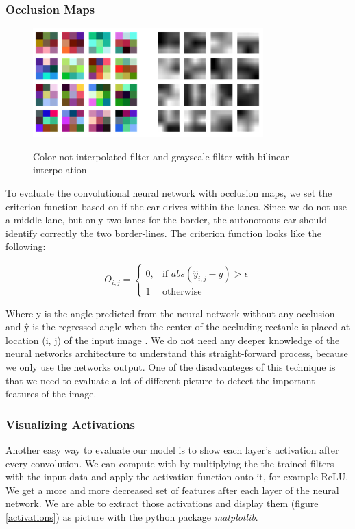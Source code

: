 \documentclass[journal]{IEEEtran}
\begin{document}
\subsubsection{Occlusion Maps}
\begin{figure}
  \begin{center}
  \includegraphics[width=3.5in]{photo/filter.png}\\
  \caption{Color not interpolated filter and grayscale filter with bilinear interpolation \cite{master}}\label{filter}
  \end{center}
\end{figure}

To evaluate the convolutional neural network with occlusion maps, we set the criterion function based on if the car drives within the lanes. Since we do not use a middle-lane, but only two lanes for the border, the autonomous car should identify correctly the two border-lines. The criterion function looks like the following:

\[
    O_{i,j}= 
\begin{cases}
    0,& \text{if } abs(\hat{y}_{i,j} - y) > \epsilon\\
    1              & \text{otherwise}
\end{cases}
\]

Where y is the angle predicted from the neural network without any occlusion and \^{y} is the regressed angle when the center of the occluding rectanle is placed at location (i, j) of the input image \cite{master}. We do not need any deeper knowledge of the neural networks architecture to understand this straight-forward process, because we only use the networks output. One of the disadvanteges of this technique is that we need to evaluate a lot of different picture to detect the important features of the image.

\subsubsection{Visualizing Activations}

Another easy way to evaluate our model is to show each layer's activation after every convolution. We can compute with by multiplying the the trained filters with the input data and apply the activation function onto it, for example ReLU. We get a more and more decreased set of features after each layer of the neural network. We are able to extract those activations and display them (figure \ref{activations}) as picture with the python package \textit{matplotlib}. 
\end{document}
